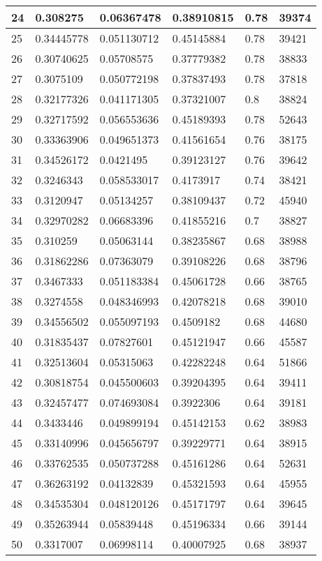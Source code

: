 \begin{longtable}{|l|l|l|l|l|l|}
24 & 0.308275 & 0.06367478 & 0.38910815 & 0.78 & 39374 \\ \hline 
25 & 0.34445778 & 0.051130712 & 0.45145884 & 0.78 & 39421 \\ \hline 
26 & 0.30740625 & 0.05708575 & 0.37779382 & 0.78 & 38833 \\ \hline 
27 & 0.3075109 & 0.050772198 & 0.37837493 & 0.78 & 37818 \\ \hline 
28 & 0.32177326 & 0.041171305 & 0.37321007 & 0.8 & 38824 \\ \hline 
29 & 0.32717592 & 0.056553636 & 0.45189393 & 0.78 & 52643 \\ \hline 
30 & 0.33363906 & 0.049651373 & 0.41561654 & 0.76 & 38175 \\ \hline 
31 & 0.34526172 & 0.0421495 & 0.39123127 & 0.76 & 39642 \\ \hline 
32 & 0.3246343 & 0.058533017 & 0.4173917 & 0.74 & 38421 \\ \hline 
33 & 0.3120947 & 0.05134257 & 0.38109437 & 0.72 & 45940 \\ \hline 
34 & 0.32970282 & 0.06683396 & 0.41855216 & 0.7 & 38827 \\ \hline 
35 & 0.310259 & 0.05063144 & 0.38235867 & 0.68 & 38988 \\ \hline 
36 & 0.31862286 & 0.07363079 & 0.39108226 & 0.68 & 38796 \\ \hline 
37 & 0.3467333 & 0.051183384 & 0.45061728 & 0.66 & 38765 \\ \hline 
38 & 0.3274558 & 0.048346993 & 0.42078218 & 0.68 & 39010 \\ \hline 
39 & 0.34556502 & 0.055097193 & 0.4509182 & 0.68 & 44680 \\ \hline 
40 & 0.31835437 & 0.07827601 & 0.45121947 & 0.66 & 45587 \\ \hline 
41 & 0.32513604 & 0.05315063 & 0.42282248 & 0.64 & 51866 \\ \hline 
42 & 0.30818754 & 0.045500603 & 0.39204395 & 0.64 & 39411 \\ \hline 
43 & 0.32457477 & 0.074693084 & 0.3922306 & 0.64 & 39181 \\ \hline 
44 & 0.3433446 & 0.049899194 & 0.45142153 & 0.62 & 38983 \\ \hline 
45 & 0.33140996 & 0.045656797 & 0.39229771 & 0.64 & 38915 \\ \hline 
46 & 0.33762535 & 0.050737288 & 0.45161286 & 0.64 & 52631 \\ \hline 
47 & 0.36263192 & 0.04132839 & 0.45321593 & 0.64 & 45955 \\ \hline 
48 & 0.34535304 & 0.048120126 & 0.45171797 & 0.64 & 39645 \\ \hline 
49 & 0.35263944 & 0.05839448 & 0.45196334 & 0.66 & 39144 \\ \hline 
50 & 0.3317007 & 0.06998114 & 0.40007925 & 0.68 & 38937 \\ \hline 
\end{longtable}